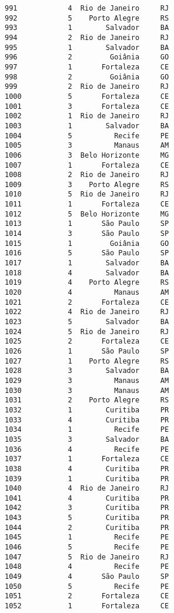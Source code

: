 \documentclass[11pt]{article}
\begin{document}
\begin{Verbatim}[commandchars=\\\{\}]
991            4  Rio de Janeiro     RJ  
992            5    Porto Alegre     RS  
993            1        Salvador     BA  
994            2  Rio de Janeiro     RJ  
995            1        Salvador     BA  
996            2         Goiânia     GO  
997            1       Fortaleza     CE  
998            2         Goiânia     GO  
999            2  Rio de Janeiro     RJ  
1000           5       Fortaleza     CE  
1001           3       Fortaleza     CE  
1002           1  Rio de Janeiro     RJ  
1003           1        Salvador     BA  
1004           5          Recife     PE  
1005           3          Manaus     AM  
1006           3  Belo Horizonte     MG  
1007           1       Fortaleza     CE  
1008           2  Rio de Janeiro     RJ  
1009           3    Porto Alegre     RS  
1010           5  Rio de Janeiro     RJ  
1011           1       Fortaleza     CE  
1012           5  Belo Horizonte     MG  
1013           1       São Paulo     SP  
1014           3       São Paulo     SP  
1015           1         Goiânia     GO  
1016           5       São Paulo     SP  
1017           1        Salvador     BA  
1018           4        Salvador     BA  
1019           4    Porto Alegre     RS  
1020           4          Manaus     AM  
1021           2       Fortaleza     CE  
1022           4  Rio de Janeiro     RJ  
1023           5        Salvador     BA  
1024           5  Rio de Janeiro     RJ  
1025           2       Fortaleza     CE  
1026           1       São Paulo     SP  
1027           1    Porto Alegre     RS  
1028           3        Salvador     BA  
1029           3          Manaus     AM  
1030           3          Manaus     AM  
1031           2    Porto Alegre     RS  
1032           1        Curitiba     PR  
1033           4        Curitiba     PR  
1034           1          Recife     PE  
1035           3        Salvador     BA  
1036           4          Recife     PE  
1037           1       Fortaleza     CE  
1038           4        Curitiba     PR  
1039           1        Curitiba     PR  
1040           4  Rio de Janeiro     RJ  
1041           4        Curitiba     PR  
1042           3        Curitiba     PR  
1043           5        Curitiba     PR  
1044           2        Curitiba     PR  
1045           1          Recife     PE  
1046           5          Recife     PE  
1047           5  Rio de Janeiro     RJ  
1048           4          Recife     PE  
1049           4       São Paulo     SP  
1050           5          Recife     PE  
1051           2       Fortaleza     CE  
1052           1       Fortaleza     CE  

\end{Verbatim}
\end{document}
